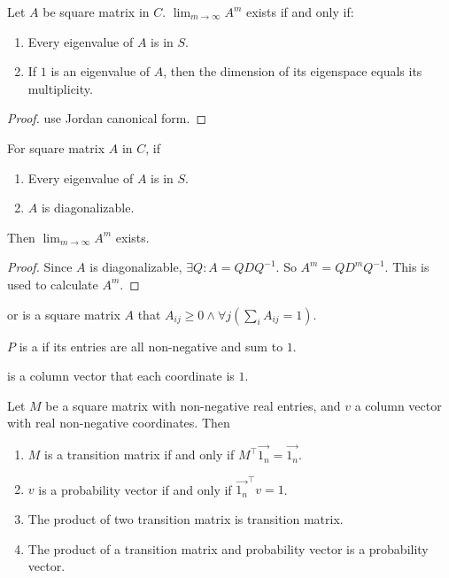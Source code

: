 \begin{theorem}
    Let $A$ be square matrix in $C$. $\displaystyle \lim_{m \rightarrow \infty} A^m$ exists if and only if:
    \begin{enumerate}
        \item Every eigenvalue of $A$ is in $S$.
        \item If $1$ is an eigenvalue of $A$, then the dimension of its eigenspace equals its multiplicity.
    \end{enumerate}
\end{theorem}
\begin{proof}
    use Jordan canonical form.
\end{proof}


\begin{theorem}
    For square matrix $A$ in $C$, if
    \begin{enumerate}
        \item Every eigenvalue of $A$ is in $S$.
        \item $A$ is diagonalizable.
    \end{enumerate}    
    Then $\displaystyle \lim_{m \rightarrow \infty} A^m$ exists.
\end{theorem}
\begin{proof}
    Since $A$ is diagonalizable, $\exists Q: A = Q D Q^{-1}$. So $A^m = Q D^m Q^{-1}$. This is used to calculate $A^m$.
\end{proof}

\begin{definition}
     or  is a square matrix $A$ that $A_{ij} \geq 0 \wedge \forall j \left(\sum_{i} A_{ij} = 1 \right)$.
\end{definition}

\begin{definition}
    $P$ is a  if its entries are all non-negative and sum to $1$.
\end{definition}

\begin{definition}
     is a column vector that each coordinate is $1$.
\end{definition}

\begin{theorem}
    Let $M$ be a square matrix with non-negative real entries, and $v$ a column vector with real non-negative coordinates. Then
    \begin{enumerate}
        \item $M$ is a transition matrix if and only if $M^\top \vec{1_n} = \vec{1_n}$.
        \item $v$ is a probability vector if and only if $\vec{1_n}^\top v = 1$.
        \item The product of two transition matrix is transition matrix.
        \item The product of a transition matrix and probability vector is a probability vector.
    \end{enumerate}    
\end{theorem}

